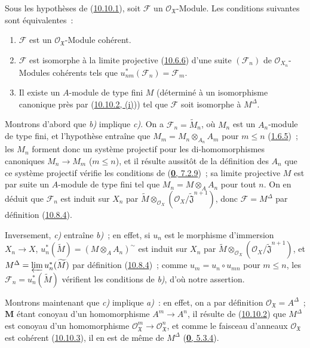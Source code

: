 \begin{proposition}[10.10.5]
\label{I.10.10.5-fr}
Sous les hypothèses de \textup{(\hyperref[I.10.10.1-fr]{10.10.1})}, soit
$\mathscr{F}$ un $\mathscr{O}_{\mathfrak{X}}$-Module. Les conditions
suivantes sont équivalentes~:
\begin{enumerate}
  \item[\textup{a)}] $\mathscr{F}$ est un $\mathscr{O}_{\mathfrak{X}}$-Module
    cohérent.
  \item[\textup{b)}] $\mathscr{F}$ est isomorphe à la limite projective
    \textup{(\hyperref[I.10.6.6-fr]{10.6.6})} d'une suite $(\mathscr{F}_n)$ de
    $\mathscr{O}_{X_n}$-Modules cohérents tels que
    $u_{nm}^*(\mathscr{F}_n)=\mathscr{F}_m$.
  \item[\textup{c)}] Il existe un $A$-module de type fini $M$ (déterminé à un
    isomorphisme canonique près par
    \textup{(\hyperref[I.10.10.2-fr]{10.10.2, (i)})}) tel que $\mathscr{F}$ soit
    isomorphe à $M^\Delta$.
\end{enumerate}
\end{proposition}

Montrons d'abord que \emph{b)} implique \emph{c)}. On a
$\mathscr{F}_n=\widetilde{M}_n$, où $M_n$ est un $A_n$-module de type
fini, et l'hypothèse entraîne que
$M_m=M_n\otimes_{A_n}A_m$ pour $m\leq n$
(\hyperref[I.1.6.5-fr]{1.6.5})~; les $M_n$ forment donc un système
projectif pour les di-homomorphismes canoniques $M_n\to M_m$
($m\leq n$), et il résulte aussitôt de la définition des $A_n$ que ce
système projectif vérifie les conditions de
(\hyperref[0.7.2.9-fr]{\textbf{0}, 7.2.9})~; sa limite projective $M$ est par
suite un $A$-module de type fini tel que
$M_n=M\otimes_A A_n$ pour tout $n$. On en déduit que $\mathscr{F}_n$
est induit sur $X_n$ par
$\widetilde M\otimes_{\mathscr{O}_X}
(\mathscr{O}_X/\widetilde{\mathfrak{J}}^{n+1})$, donc
$\mathscr{F}=M^\Delta$ par définition
(\hyperref[I.10.8.4-fr]{10.8.4}).

Inversement, \emph{c)} entraîne \emph{b)}~; en effet, si $u_n$ est le morphisme
d'immersion $X_n\to X$,
$u_n^*(\widetilde M)=(M\otimes_A A_n)^{\sim}$ est induit sur $X_n$ par
$\widetilde M\otimes_{\mathscr{O}_X}
(\mathscr{O}_X/\widetilde{\mathfrak{J}}^{n+1})$, et
$M^\Delta=\varprojlim u_n^*(\widetilde M)$ par définition
(\hyperref[I.10.8.4-fr]{10.8.4})~; comme
$u_m=u_n\circ u_{mn}$ pour $m\leq n$, les
$\mathscr{F}_n=u_n^*(\widetilde M)$ vérifient les conditions de \emph{b)},
d'où notre assertion.

Montrons maintenant que \emph{c)} implique \emph{a)}~: en effet, on a par définition
$\mathscr{O}_{\mathfrak{X}}=A^\Delta$~; $\mathbf{M}$ étant conoyau d'un
homomorphisme $A^m\to A^n$, il résulte de
(\hyperref[I.10.10.2-fr]{10.10.2}) que $M^\Delta$ est conoyau d'un
homomorphisme
$\mathscr{O}_{\mathfrak{X}}^m\to\mathscr{O}_{\mathfrak{X}}^n$, et
comme le faisceau d'anneaux $\mathscr{O}_{\mathfrak{X}}$ est cohérent
(\hyperref[I.10.10.3-fr]{10.10.3}), il en est de même de $M^\Delta$
(\hyperref[0.5.3.4-fr]{\textbf{0}, 5.3.4}).

